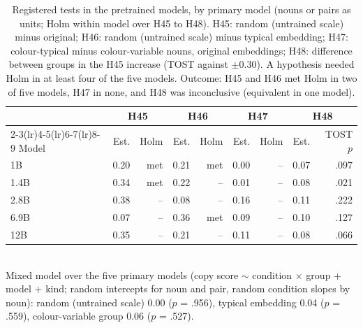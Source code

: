 \begin{table}[!htbp]
\centering\small

\begin{tabular}{@{}lrrrrrrrr@{}}
\toprule
 & \multicolumn{2}{c}{H45} & \multicolumn{2}{c}{H46} & \multicolumn{2}{c}{H47} & \multicolumn{2}{c}{H48} \\ \cmidrule(lr){2-3}\cmidrule(lr){4-5}\cmidrule(lr){6-7}\cmidrule(lr){8-9}
Model & Est. & Holm & Est. & Holm & Est. & Holm & Est. & TOST $p$ \\
\midrule
1B & 0.20 & met & 0.21 & met & 0.00 & -- & 0.07 & .097 \\
1.4B & 0.34 & met & \textminus{}0.22 & -- & \textminus{}0.01 & -- & \textminus{}0.08 & .021 \\
2.8B & \textminus{}0.38 & -- & 0.08 & -- & \textminus{}0.16 & -- & 0.11 & .222 \\
6.9B & 0.07 & -- & 0.36 & met & \textminus{}0.09 & -- & 0.10 & .127 \\
12B & \textminus{}0.35 & -- & \textminus{}0.21 & -- & 0.11 & -- & 0.08 & .066 \\
\bottomrule
\end{tabular}
\\[2pt]{\footnotesize Mixed model over the five primary models (copy score $\sim$ condition $\times$ group + model + kind; random intercepts for noun and pair, random condition slopes by noun): random (untrained scale) 0.00 ($p$ = .956), typical embedding \textminus{}0.04 ($p$ = .559), colour-variable group 0.06 ($p$ = .527).}
\caption{Registered tests in the pretrained models, by primary model (nouns or pairs as units; Holm within model over H45 to H48). H45: random (untrained scale) minus original; H46: random (untrained scale) minus typical embedding; H47: colour-typical minus colour-variable nouns, original embeddings; H48: difference between groups in the H45 increase (TOST against $\pm$0.30). A hypothesis needed Holm in at least four of the five models. Outcome: H45 and H46 met Holm in two of five models, H47 in none, and H48 was inconclusive (equivalent in one model).}
\label{tab:N6}
\end{table}

